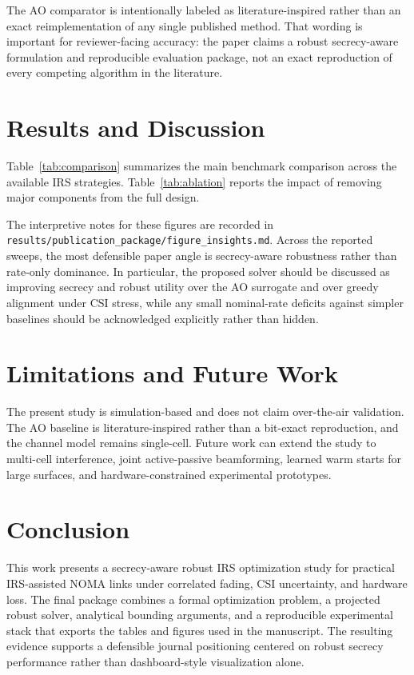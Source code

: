 \documentclass[journal]{IEEEtran}
\begin{document}
The AO comparator is intentionally labeled as literature-inspired rather than an exact reimplementation of any single published method. That wording is important for reviewer-facing accuracy: the paper claims a robust secrecy-aware formulation and reproducible evaluation package, not an exact reproduction of every competing algorithm in the literature.

\section{Results and Discussion}


Table~\ref{tab:comparison} summarizes the main benchmark comparison across the available IRS strategies. Table~\ref{tab:ablation} reports the impact of removing major components from the full design.







The interpretive notes for these figures are recorded in \texttt{results/publication\_package/figure\_insights.md}. Across the reported sweeps, the most defensible paper angle is secrecy-aware robustness rather than rate-only dominance. In particular, the proposed solver should be discussed as improving secrecy and robust utility over the AO surrogate and over greedy alignment under CSI stress, while any small nominal-rate deficits against simpler baselines should be acknowledged explicitly rather than hidden.

\section{Limitations and Future Work}
The present study is simulation-based and does not claim over-the-air validation. The AO baseline is literature-inspired rather than a bit-exact reproduction, and the channel model remains single-cell. Future work can extend the study to multi-cell interference, joint active-passive beamforming, learned warm starts for large surfaces, and hardware-constrained experimental prototypes.

\section{Conclusion}
This work presents a secrecy-aware robust IRS optimization study for practical IRS-assisted NOMA links under correlated fading, CSI uncertainty, and hardware loss. The final package combines a formal optimization problem, a projected robust solver, analytical bounding arguments, and a reproducible experimental stack that exports the tables and figures used in the manuscript. The resulting evidence supports a defensible journal positioning centered on robust secrecy performance rather than dashboard-style visualization alone.
\end{document}
